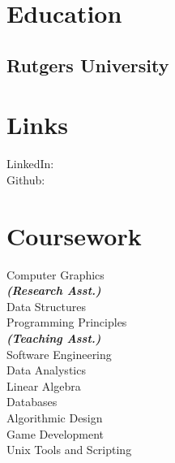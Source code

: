 \documentclass[]{deedy-resume-openfont}
\begin{document}
%
%


%
%

\begin{minipage}[t]{0.33\textwidth} 


\section{Education} 

\subsection{Rutgers University}
\sectionsep
{}
\sectionsep


\section{Links} 
LinkedIn:  \href{https://www.linkedin.com/in/DougRudolphJr}{} \\
Github: \href{https://github.com/11}
{} \\
\sectionsep


\section{Coursework}
Computer Graphics \\
{\footnotesize \textit{\textbf{(Research Asst.) }}} \\
Data Structures \\
Programming Principles\\
{\footnotesize \textit{\textbf{(Teaching Asst.) }}} \\
Software Engineering \\
Data Analystics\\
Linear Algebra\\
Databases \\
Algorithmic Design \\ 
Game Development \\
Unix Tools and Scripting \\
\sectionsep


\end{minipage}
\end{document}
